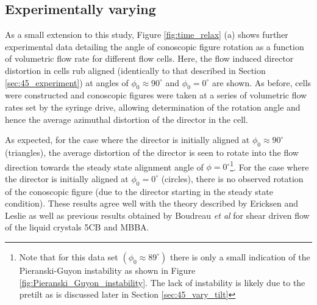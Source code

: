 \subsection{Experimentally varying}
As a small extension to this study, Figure \ref{fig:time_relax} (a) shows further experimental data detailing the angle of conoscopic figure rotation as a function of volumetric flow rate for different flow cells. Here, the flow induced director distortion in cells rub aligned (identically to that described in Section \ref{sec:45_experiment}) at angles of $\phi_0\approx90^{\circ}$ and $\phi_0=0^{\circ}$ are shown. As before, cells were constructed and conoscopic figures were taken at a series of volumetric flow rates set by the syringe drive, allowing determination of the rotation angle and hence the average azimuthal distortion of the director in the cell.

As expected, for the case where the director is initially aligned at $\phi_0\approx90^{\circ}$ (triangles), the average distortion of the director is seen to rotate into the flow direction towards the steady state alignment angle of $\phi=0^{\circ}$\footnote{Note that for this data set $\left(\phi_0\approx89^{\circ}\right)$ there is only a small indication of the Pieranski-Guyon instability as shown in Figure \ref{fig:Pieranski_Guyon_instability}. The lack of instability is likely due to the pretilt as is discussed later in Section \ref{sec:45_vary_tilt}}. For the case where the director is initially aligned at $\phi_0=0^{\circ}$ (circles), there is no observed rotation of the conoscopic figure (due to the director starting in the steady state condition). These results agree well with the theory described by Ericksen and Leslie as well as previous results obtained by Boudreau \textit{et al} \cite{Boudreau1999} for shear driven flow of the liquid crystals 5CB and MBBA.




